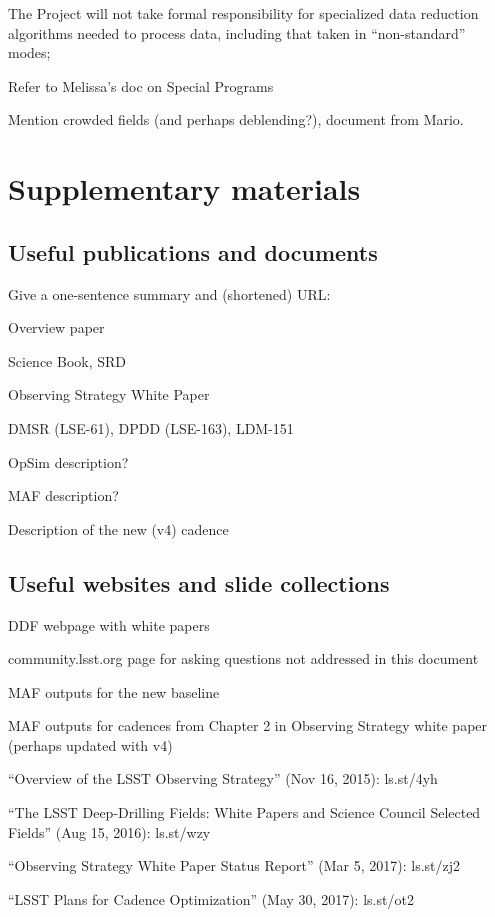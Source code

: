 \documentclass[DM,lsstdraft,toc,usenatbib]{lsstdoc}
\begin{document}
The Project will not take formal responsibility for specialized data reduction algorithms needed to process
data, including that taken in ``non-standard'' modes; 
   
Refer to Melissa's doc on Special Programs 

Mention crowded fields (and perhaps deblending?), document from Mario. 



\section{Supplementary materials} 


\subsection{Useful publications and documents}

Give a one-sentence summary and (shortened) URL:  

Overview paper

Science Book, SRD 

Observing Strategy White Paper 

DMSR (LSE-61), DPDD (LSE-163), LDM-151 

OpSim description?  

MAF description?  

Description of the new (v4) cadence 

\subsection{Useful websites and slide collections}

DDF webpage with white papers 

community.lsst.org page for asking questions not addressed in this document 

MAF outputs for the new baseline

MAF outputs for cadences from Chapter 2 in Observing Strategy white paper (perhaps
updated with v4)

``Overview of the LSST Observing Strategy'' (Nov 16, 2015): ls.st/4yh

``The LSST Deep-Drilling Fields: White Papers and Science Council Selected Fields'' (Aug 15, 2016): ls.st/wzy

``Observing Strategy White Paper Status Report'' (Mar 5, 2017): ls.st/zj2

``LSST Plans for Cadence Optimization'' (May 30, 2017): ls.st/ot2 
\end{document}
